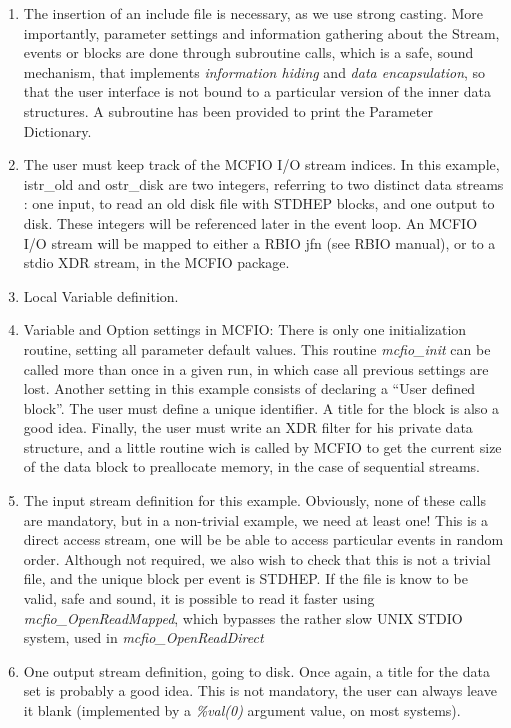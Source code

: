 \begin{enumerate}
\item The insertion of an include file is necessary, as we use strong  casting.
More importantly,  parameter settings and information gathering about
the Stream, events or blocks  are done through subroutine calls, 
which is a safe, sound mechanism, that implements {\em information hiding}
and {\em data encapsulation}, so that the user interface is not 
bound to a particular version of the inner data structures. A subroutine 
has been provided to print the Parameter Dictionary. 

\item  The user must keep track of the MCFIO I/O stream indices. In this 
example,  istr\_old and ostr\_disk are two integers, referring to two distinct
data streams : one input, to read an old  disk file with STDHEP blocks, and one
output to disk.  These integers will be referenced  later in the event loop.  
An MCFIO I/O stream will be mapped to either a RBIO jfn (see RBIO 
manual),  or to a stdio XDR stream, in the MCFIO package.

\item Local Variable definition.

\item  Variable and Option settings in MCFIO: There is only one  
initialization routine, setting all parameter default values. This routine {\em
mcfio\_init} can be called more than once in a given  run, in which case all
previous settings are lost. Another setting in this example consists of
declaring a  ``User defined block''. The user must define a unique identifier. A
title for the block is also a  good idea. Finally, the user must write an XDR
filter for  his private data structure, and a little routine wich is 
called by MCFIO to get the current size of the data block to preallocate
memory, in the case of sequential streams.  

\item The input stream definition for this example. Obviously, none of these 
calls are mandatory, but in a non-trivial example, we need  at least one! This
is a direct access stream, one will be  be able to access particular  events in
random order. Although not required, we also wish to check that this is  not a
trivial file, and the unique block per event is STDHEP.  If the file is know 
to be valid, safe and sound, it is possible to read it faster using {\em
mcfio\_OpenReadMapped}, which bypasses the rather slow UNIX STDIO system, used
in {\em mcfio\_OpenReadDirect}

\item One output stream definition, going to disk. Once again, a title for the
data set is probably a good idea. This is not mandatory, the user can always
leave it blank (implemented by a {\em \%val(0)} argument value, on most
systems). 
		
\end{enumerate}

